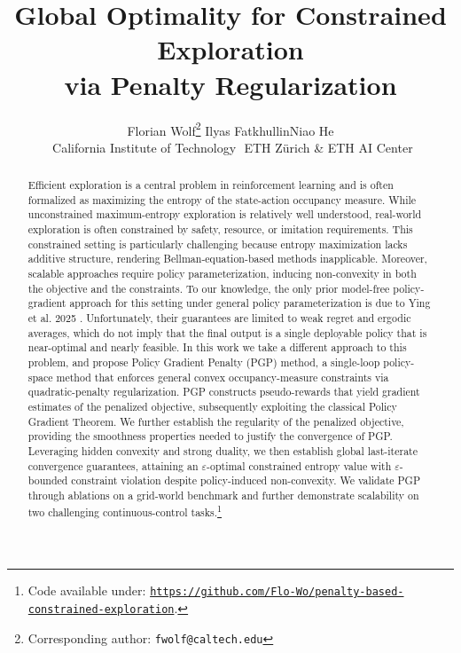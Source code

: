 \documentclass{article}
\title{Global Optimality for Constrained Exploration \\ via Penalty Regularization}
\author{%
  Florian Wolf\thanks{Corresponding author: \texttt{fwolf@caltech.edu}}\,\,\footnotemark[2] \And Ilyas Fatkhullin\footnotemark[3] \And Niao He\footnotemark[3]\\
  \AND \textnormal{\footnotemark[2]\,\,California Institute of Technology \footnotemark[3]\,\,ETH Zürich 
  \& ETH AI Center} %
}
\theoremstyle{plain}
\theoremstyle{definition}
\theoremstyle{remark}
\def\epsilon{{\varepsilon}}
\begin{document}
\maketitle

\begin{abstract}
Efficient exploration is a central problem in reinforcement learning and is
often formalized as maximizing the entropy of the state-action occupancy
measure. While unconstrained maximum-entropy exploration is relatively well
understood, real-world exploration is often constrained by safety,
resource, or imitation requirements. This constrained setting is
particularly challenging because entropy maximization lacks additive
structure, rendering Bellman-equation-based methods inapplicable. Moreover,
scalable approaches require policy parameterization, inducing non-convexity
in both the objective and the constraints. To our knowledge, the only prior
model-free policy-gradient approach for this setting under general policy
parameterization is due to Ying et al. 2025
\cite{yingPolicybasedPrimalDualMethods2025}. Unfortunately, their
guarantees are limited to weak regret and ergodic averages, which do not
imply that the final output is a single deployable policy that is
near-optimal and nearly feasible. In this work we take a different approach
to this problem, and propose Policy Gradient Penalty (PGP) method, a
single-loop policy-space method that enforces general convex
occupancy-measure constraints via quadratic-penalty regularization. PGP
constructs pseudo-rewards that yield gradient estimates of the penalized
objective, subsequently exploiting the classical Policy Gradient Theorem.
We further establish the regularity of the penalized objective, providing
the smoothness properties needed to justify the convergence of PGP.
Leveraging hidden convexity and strong duality, we then establish global
last-iterate convergence guarantees, attaining an $\epsilon$-optimal
constrained entropy value with $\epsilon$-bounded constraint violation
despite policy-induced non-convexity. We validate PGP through ablations on
a grid-world benchmark and further demonstrate scalability on two
challenging continuous-control tasks.\footnote{Code available under:
 \href{https://github.com/Flo-Wo/penalty-based-constrained-exploration
 }{\texttt{https://github.com/Flo-Wo/penalty-based-constrained-exploration}}.}

\end{abstract}
\end{document}
